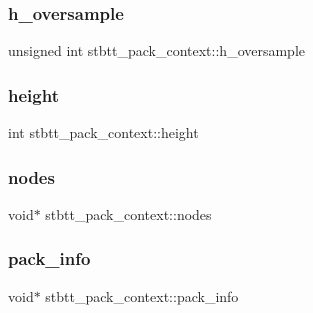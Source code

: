 \subsubsection{\texorpdfstring{h\+\_\+oversample}{h\_oversample}}
{\footnotesize\ttfamily unsigned int stbtt\+\_\+pack\+\_\+context\+::h\+\_\+oversample}

\hypertarget{structstbtt__pack__context_a817ec010d7f09ba9776517c5a87f13a7}{}\label{structstbtt__pack__context_a817ec010d7f09ba9776517c5a87f13a7} 
\subsubsection{\texorpdfstring{height}{height}}
{\footnotesize\ttfamily int stbtt\+\_\+pack\+\_\+context\+::height}

\hypertarget{structstbtt__pack__context_a11a73fa6860e6be1ac039fcca9db2c7c}{}\label{structstbtt__pack__context_a11a73fa6860e6be1ac039fcca9db2c7c} 
\subsubsection{\texorpdfstring{nodes}{nodes}}
{\footnotesize\ttfamily void$\ast$ stbtt\+\_\+pack\+\_\+context\+::nodes}

\hypertarget{structstbtt__pack__context_a303a72f0a39479b439fa531925be7031}{}\label{structstbtt__pack__context_a303a72f0a39479b439fa531925be7031} 
\subsubsection{\texorpdfstring{pack\+\_\+info}{pack\_info}}
{\footnotesize\ttfamily void$\ast$ stbtt\+\_\+pack\+\_\+context\+::pack\+\_\+info}

\hypertarget{structstbtt__pack__context_a1191f34fa995910044191584f0d7a803}{}\label{structstbtt__pack__context_a1191f34fa995910044191584f0d7a803} 
